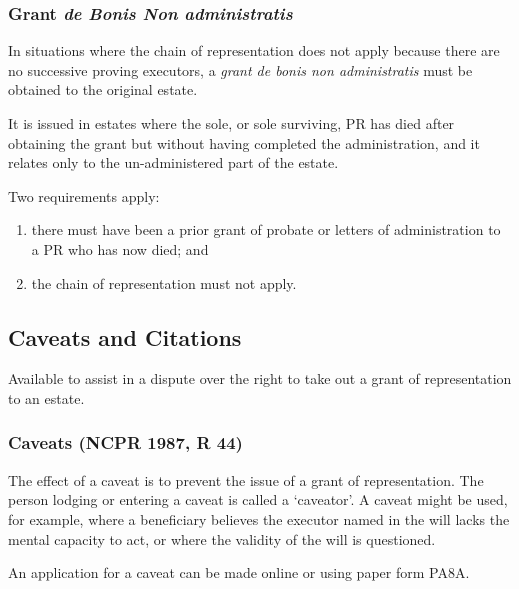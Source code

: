 \documentclass[
]{article}
\providecommand{\tightlist}{%
  \setlength{\itemsep}{0pt}\setlength{\parskip}{0pt}}
\begin{document}
\hypertarget{grant-de-bonis-non-administratis}{%
\subsubsection{\texorpdfstring{Grant \emph{de Bonis Non
administratis}}{Grant de Bonis Non administratis}}\label{grant-de-bonis-non-administratis}}

In situations where the chain of representation does not apply because
there are no successive proving executors, a \emph{grant de bonis non
administratis} must be obtained to the original estate.

It is issued in estates where the sole, or sole surviving, PR has died
after obtaining the grant but without having completed the
administration, and it relates only to the un-administered part of the
estate.

Two requirements apply:

\begin{enumerate}
\def\labelenumi{\arabic{enumi}.}
\tightlist
\item
  there must have been a prior grant of probate or letters of
  administration to a PR who has now died; and
\item
  the chain of representation must not apply.
\end{enumerate}

\hypertarget{caveats-and-citations}{%
\subsection{Caveats and Citations}\label{caveats-and-citations}}

Available to assist in a dispute over the right to take out a grant of
representation to an estate.

\hypertarget{caveats-ncpr-1987-r-44}{%
\subsubsection{Caveats (NCPR 1987, R 44)}\label{caveats-ncpr-1987-r-44}}

The effect of a caveat is to prevent the issue of a grant of
representation. The person lodging or entering a caveat is called a
`caveator'. A caveat might be used, for example, where a beneficiary
believes the executor named in the will lacks the mental capacity to
act, or where the validity of the will is questioned.

An application for a caveat can be made online or using paper form PA8A.
\end{document}
